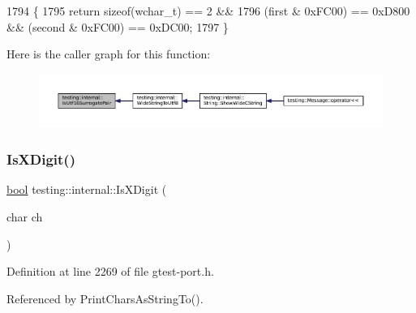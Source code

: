 \begin{DoxyCode}
1794                                                                 \{
1795   \textcolor{keywordflow}{return} \textcolor{keyword}{sizeof}(wchar\_t) == 2 &&
1796       (first & 0xFC00) == 0xD800 && (second & 0xFC00) == 0xDC00;
1797 \}
\end{DoxyCode}
Here is the caller graph for this function\+:
\nopagebreak
\begin{figure}[H]
\begin{center}
\leavevmode
\includegraphics[width=350pt]{namespacetesting_1_1internal_a681895f8cc32286211be9889da107394_icgraph}
\end{center}
\end{figure}
\mbox{\label{namespacetesting_1_1internal_aa234ef141278263fb143b616c74c86e7}} 
\subsubsection{\texorpdfstring{Is\+X\+Digit()}{IsXDigit()}\hspace{0.1cm}{\footnotesize\ttfamily [1/2]}}
{\footnotesize\ttfamily \hyperlink{classbool}{bool} testing\+::internal\+::\+Is\+X\+Digit (\begin{DoxyParamCaption}\item[{char}]{ch }\end{DoxyParamCaption})\hspace{0.3cm}{\ttfamily [inline]}}



Definition at line 2269 of file gtest-\/port.\+h.



Referenced by Print\+Chars\+As\+String\+To().


